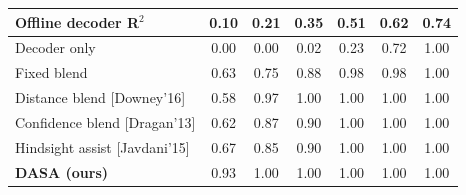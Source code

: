 \begin{tabular}{l cccccc}
\toprule
Offline decoder R$^2$ & 0.10 & 0.21 & 0.35 & 0.51 & 0.62 & 0.74 \\
\midrule
Decoder only & 0.00 & 0.00 & 0.02 & 0.23 & 0.72 & 1.00 \\
Fixed blend & 0.63 & 0.75 & 0.88 & 0.98 & 0.98 & 1.00 \\
Distance blend [Downey'16] & 0.58 & 0.97 & 1.00 & 1.00 & 1.00 & 1.00 \\
Confidence blend [Dragan'13] & 0.62 & 0.87 & 0.90 & 1.00 & 1.00 & 1.00 \\
Hindsight assist [Javdani'15] & 0.67 & 0.85 & 0.90 & 1.00 & 1.00 & 1.00 \\
\textbf{DASA (ours)} & 0.93 & 1.00 & 1.00 & 1.00 & 1.00 & 1.00 \\
\bottomrule
\end{tabular}
